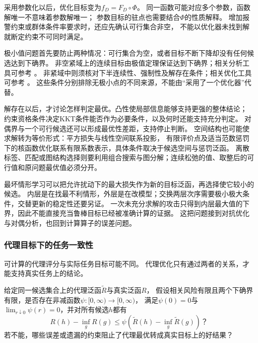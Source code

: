 采用参数化以后，优化目标变为$f_D=F_D\circ\Phi$。
同一函数可能对应多个参数，函数解唯一不意味着参数解唯一；
参数目标的驻点也需要结合$\Phi$的性质解释。
增加报警约束或群体条件率要求时，还应先确认可行集合非空，
不能以优化器未找到解就断定约束不可同时满足。

极小值问题首先要防止两种情况：可行集合为空，或者目标不断下降却没有任何候选达到下确界。
非空紧域上的连续目标由极值定理保证达到下确界；相关分析工具可参考
。
非紧域中则须核对下半连续性、强制性及解存在条件；相关优化工具可参考
。
这些条件分别排除无极小点的不同来源，不能由“采用了一个优化器”代替。

解存在以后，才讨论怎样判定最优。凸性使局部信息能够支持更强的整体结论；
约束资格条件决定KKT条件能否作为必要条件，以及何时还能支持充分判定。
对偶界与一个可行候选还可以形成最优性差距，支持停止判断。
空间结构也可能使求解转为等价形式：平方损失与线性空间联系投影，
有限评价点及适当范数惩罚下的核函数优化联系有限系数表示，具体条件取决于候选空间与惩罚泛函。
离散标签、匹配或图结构选择则要利用组合搜索与图分解；连续松弛的值、取整后的可行值和原问题最优值必须分开。

最坏情形学习可以把允许扰动下的最大损失作为新的目标泛函，再选择使它较小的候选。
内层是在找最不利情形，外层是在改模型；交换两层次序需要极小极大条件，交替更新的稳定性还要另证。
一次未充分求解的攻击只得到内层最大值的下界，因此不能直接充当鲁棒目标已经被准确计算的证据。
这把问题接到对抗优化与对偶分析，也回到计算算子的误差问题。

\subsubsection{代理目标下的任务一致性}
\label{sec:future-analysis-proxy-risk}

可计算的代理评分与实际任务目标可能不同。
代理优化只有通过两者的关系，才能支持真实任务上的结论。

\begin{mathproblem}[代理泛函能否支持真实目标]
  \label{question:future-proxy-risk}
  给定同一候选集合上的代理泛函$\widetilde R$与真实泛函$R$，
  假设相关风险有限且两个下确界有限，是否存在非减函数$\psi:[0,\infty)\to[0,\infty)$，
  满足$\psi(0)=0$与$\lim_{r\downarrow0}\psi(r)=0$，并对所有候选$h$都有
  \[
    R(h)-\inf_gR(g)
    \leq\psi\!\left(\widetilde R(h)-\inf_g\widetilde R(g)\right)\text{？}
  \]
  若不能，哪些误差或遗漏的约束阻止了代理最优转成真实目标上的好结果？
\end{mathproblem}

